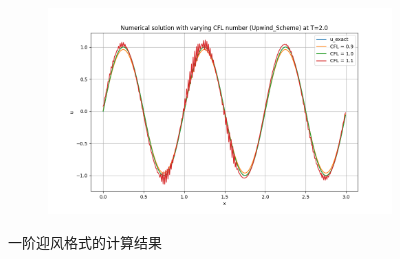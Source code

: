 \documentclass[12pt, a4paper]{article}
\begin{document}
\begin{figure}[htbp]
    \vspace{0.5cm}
    \centering
    \begin{subfigure}[b]{0.45\textwidth} 
        \centering
        \includegraphics[width=\textwidth]{./pictures/Stablity_of_Upwind_Scheme_at_2.0.png} 
    \end{subfigure}
    \caption{一阶迎风格式的计算结果}
\end{figure}
\end{document}
